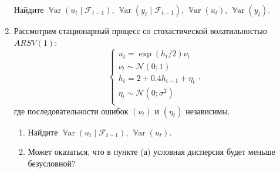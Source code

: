 \documentclass[12pt]{article}
\DeclareMathOperator{\Var}{\mathbb{V}ar}
\newcommand \cN{\mathcal{N}}
\newcommand{\cF}{\mathcal{F}}
\begin{document}
\begin{enumerate}
Найдите $\Var(u_t \mid \cF_{t-1})$, $\Var(y_t \mid \cF_{t-1})$, $\Var(u_t)$, $\Var(y_t)$.

\item Рассмотрим стационарный процесс со стохастической волатильностью $ARSV(1)$:
\[
\begin{cases}
u_t = \exp(h_t/2) \nu_t \\
\nu_t \sim \cN(0;1) \\
h_t = 2 + 0.4 h_{t-1} + \eta_t \\
\eta_t \sim \cN(0;\sigma^2) \\
\end{cases},
\]
где последовательности ошибок $(\nu_t)$ и $(\eta_t)$ независимы. 

\begin{enumerate}
    \item Найдите $\Var(u_t \mid \cF_{t-1})$, $\Var(u_t)$.
    \item Может оказаться, что в пункте (а) условная дисперсия будет меньше безусловной?
\end{enumerate}


\end{enumerate}
\end{document}
